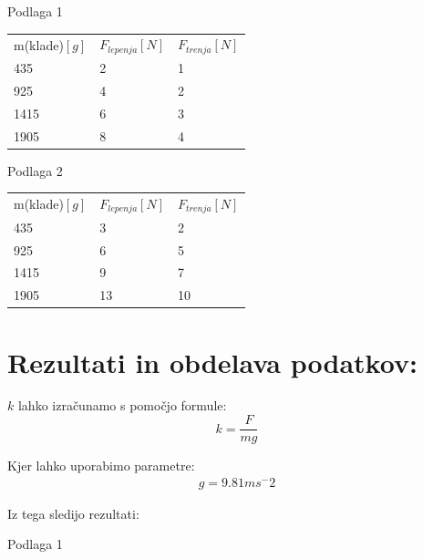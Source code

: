 \documentclass[a4paper]{article}
\begin{document}
\begin{multicols}{2}

Podlaga 1
\begin{table}[H]
\centering
\renewcommand{\arraystretch}{1.5}
\begin{tabular}{lll}
   m(klade)$[g]$ & $F_{lepenja}[N]$ & $F_{trenja}[N]$ \\
   435  & 2 & 1 \\
   925  & 4 & 2 \\
   1415 & 6 & 3 \\
   1905 & 8 & 4
\end{tabular}
\end{table}

\columnbreak

Podlaga 2
\begin{table}[H]
\centering
\renewcommand{\arraystretch}{1.5}
\begin{tabular}{lll}
   m(klade)$[g]$ & $F_{lepenja}[N]$ & $F_{trenja}[N]$ \\
435  & 3  & 2 \\
925  & 6  & 5   \\
1415 & 9  & 7   \\
1905 & 13 & 10 
\end{tabular}
\end{table}

\end{multicols}
\section*{Rezultati in obdelava podatkov:}

\begin{multicols}{2}
$k$ lahko izračunamo s pomočjo formule:
\begin{equation}
   k = \frac{F}{mg}
\end{equation}

\columnbreak

Kjer lahko uporabimo parametre:
\begin{gather}
   g = 9.81ms^-2
\end{gather}

\end{multicols}

Iz tega sledijo rezultati:

Podlaga 1
\end{document}
